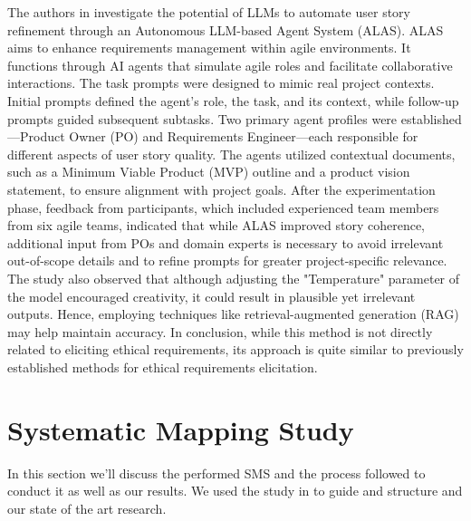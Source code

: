 The authors in \cite{zhang2024llm} investigate the potential of LLMs to automate user story refinement through an Autonomous LLM-based Agent System (ALAS). ALAS aims to enhance 
requirements management within agile environments. It functions through AI agents that simulate agile roles and facilitate collaborative interactions.
The task prompts were designed to mimic real project contexts. Initial prompts defined the agent's role, the task, and its context, while follow-up prompts guided subsequent subtasks. Two primary agent profiles were 
established—Product Owner (PO) and Requirements Engineer—each responsible for different aspects of user story quality. The agents utilized contextual documents, such as a Minimum Viable Product (MVP) outline and a 
product vision statement, to ensure alignment with project goals.
After the experimentation phase, feedback from participants, which included experienced team members from six agile teams, indicated that while ALAS improved story coherence, additional input from POs and domain experts 
is necessary to avoid irrelevant out-of-scope details and to refine prompts for greater project-specific relevance. The study also observed that although adjusting the "Temperature" parameter of the model encouraged 
creativity, it could result in plausible yet irrelevant outputs. Hence, employing techniques like retrieval-augmented generation (RAG) may help maintain accuracy.
In conclusion, while this method is not directly related to eliciting ethical requirements, its approach is quite similar to previously established methods for ethical requirements elicitation.




\section{Systematic Mapping Study}
\label{sec: SMS}
In this section we'll discuss the performed SMS and the process followed to conduct it as well as our results. We used the study in \cite{bombonatti2016usability} 
to guide and structure and our state of the art research.



